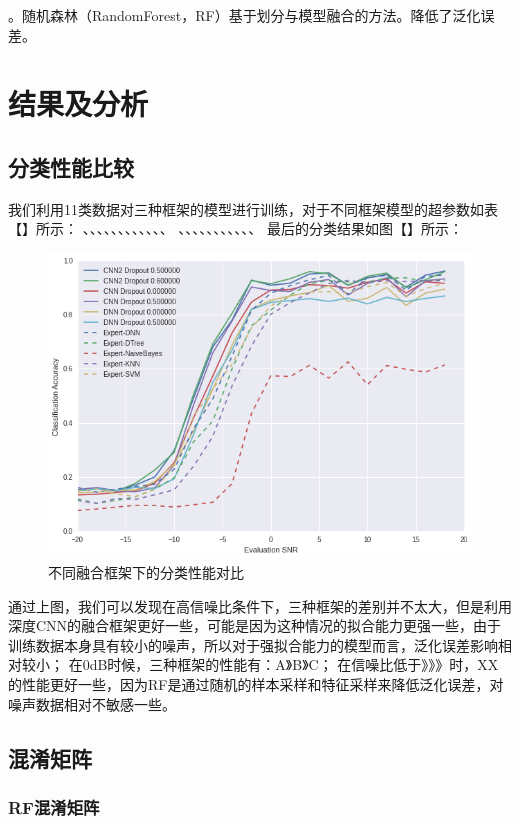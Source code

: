 。随机森林（RandomForest，RF）基于划分与模型融合的方法。降低了泛化误差。

\section{结果及分析}

\subsection{分类性能比较}
我们利用11类数据对三种框架的模型进行训练，对于不同框架模型的超参数如表【】所示：
、、、、、、、、、、、、
、、、、、、、、、、、
最后的分类结果如图【】所示：

\begin{figure}[!h]
	\centering
	\includegraphics[scale=0.3]{figures/chapter_3/result}
	\caption{不同融合框架下的分类性能对比}\label{fig_2_2}
\end{figure}

通过上图，我们可以发现在高信噪比条件下，三种框架的差别并不太大，但是利用深度CNN的融合框架更好一些，可能是因为这种情况的拟合能力更强一些，由于训练数据本身具有较小的噪声，所以对于强拟合能力的模型而言，泛化误差影响相对较小；
在0dB时候，三种框架的性能有：A》B》C；
在信噪比低于》》》时，XX的性能更好一些，因为RF是通过随机的样本采样和特征采样来降低泛化误差，对噪声数据相对不敏感一些。

\subsection{混淆矩阵}

\subsubsection{RF混淆矩阵}


